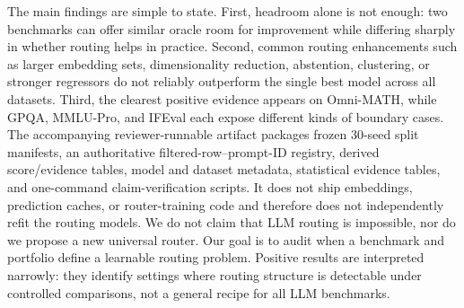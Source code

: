 \documentclass{article}
\begin{document}
The main findings are simple to state. First, headroom alone is not enough: two benchmarks can offer similar oracle room for improvement while differing sharply in whether routing helps in practice. Second, common routing enhancements such as larger embedding sets, dimensionality reduction, abstention, clustering, or stronger regressors do not reliably outperform the single best model across all datasets. Third, the clearest positive evidence appears on Omni-MATH, while GPQA, MMLU-Pro, and IFEval each expose different kinds of boundary cases. The accompanying reviewer-runnable artifact packages frozen 30-seed split manifests, an authoritative filtered-row--prompt-ID registry, derived score/evidence tables, model and dataset metadata, statistical evidence tables, and one-command claim-verification scripts. It does not ship embeddings, prediction caches, or router-training code and therefore does not independently refit the routing models. We do not claim that LLM routing is impossible, nor do we propose a new universal router. Our goal is to audit when a benchmark and portfolio define a learnable routing problem. Positive results are interpreted narrowly: they identify settings where routing structure is detectable under controlled comparisons, not a general recipe for all LLM benchmarks.
\end{document}
